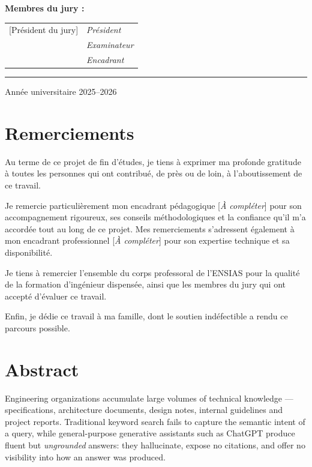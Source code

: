 \documentclass[12pt,a4paper,oneside]{report}
\begin{document}
\begin{titlepage}
\vspace{1.4cm}
\textbf{Membres du jury :}\\[4pt]
\begin{tabular}{ll}
[Président du jury] & \textit{Président} \\
[Examinateur] & \textit{Examinateur} \\
[Encadrant] & \textit{Encadrant} \\
\end{tabular}

\vfill
{\color{lineGray}\rule{\textwidth}{0.5pt}}
\vspace{0.3cm}
{\small Année universitaire 2025--2026\par}
\end{titlepage}

\chapter*{Remerciements}

Au terme de ce projet de fin d'études, je tiens à exprimer ma profonde gratitude
à toutes les personnes qui ont contribué, de près ou de loin, à l'aboutissement
de ce travail.

Je remercie particulièrement mon encadrant pédagogique [\textit{À compléter}] pour
son accompagnement rigoureux, ses conseils méthodologiques et la confiance qu'il
m'a accordée tout au long de ce projet. Mes remerciements s'adressent également à
mon encadrant professionnel [\textit{À compléter}] pour son expertise technique et
sa disponibilité.

Je tiens à remercier l'ensemble du corps professoral de l'ENSIAS pour la qualité
de la formation d'ingénieur dispensée, ainsi que les membres du jury qui ont
accepté d'évaluer ce travail.

Enfin, je dédie ce travail à ma famille, dont le soutien indéfectible a rendu ce
parcours possible.

\chapter*{Abstract}

Engineering organizations accumulate large volumes of technical knowledge —
specifications, architecture documents, design notes, internal guidelines and
project reports. Traditional keyword search fails to capture the semantic intent
of a query, while general-purpose generative assistants such as ChatGPT produce
fluent but \emph{ungrounded} answers: they hallucinate, expose no citations, and
offer no visibility into how an answer was produced.
\end{document}
